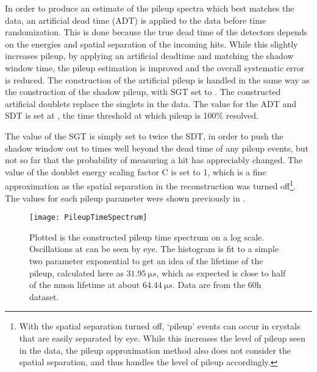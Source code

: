 In order to produce an estimate of the pileup spectra which best matches the data, an artificial dead time (ADT) is applied to the data before time randomization. This is done because the true dead time of the detectors depends on the energies and spatial separation of the incoming hits. While this slightly increases pileup, by applying an artificial deadtime and matching the shadow window time, the pileup estimation is improved and the overall systematic error is reduced. The construction of the artificial pileup is handled in the same way as the construction of the shadow pileup, with SGT set to . The constructed artificial doublets replace the singlets in the data. The value for the ADT and SDT is set at , the time threshold at which pileup is 100\% resolved. 

The value of the SGT is simply set to twice the SDT, in order to push the shadow window out to times well beyond the dead time of any pileup events, but not so far that the probability of measuring a hit has appreciably changed. The value of the doublet energy scaling factor C is set to 1, which is a fine approximation as the spatial separation in the reconstruction was turned off\footnote{With the spatial separation turned off, `pileup' events can occur in crystals that are easily separated by eye. While this increases the level of pileup seen in the data, the pileup approximation method also does not consider the spatial separation, and thus handles the level of pileup accordingly.}. The values for each pileup parameter were shown previously in . 


    \begin{figure}
        \centering
        \texttt{[image: PileupTimeSpectrum]}
        \caption[Pileup time spectrum above threshold]{Plotted is the constructed pileup time spectrum on a log scale. Oscillations at \wa can be seen by eye. The histogram is fit to a simple two parameter exponential to get an idea of the lifetime of the pileup, calculated here as $\SI{31.95}{\micro s}$, which as expected is close to half of the muon lifetime at about $\SI{64.44}{\micro s}$. Data are from the 60h dataset.}
        \label{fig:PileupTimeSpectrum}
    \end{figure}


